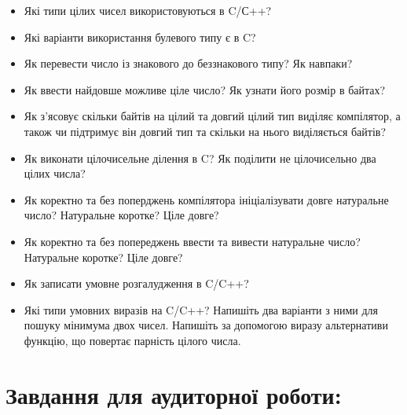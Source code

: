 \documentclass[a5paper,titlepage,openany,twoside,draft]{book_unv}%
\begin{document}
\begin{itemize}
\item Які типи цілих чисел використовуються в C/С++?
\item Які варіанти використання булевого типу є в C?
\item Як перевести число із знакового до беззнакового типу? Як навпаки?
\item Як ввести найдовше можливе ціле число? Як узнати його розмір в
байтах?
\item Як з'ясовує скільки байтів на цілий та довгий
цілий тип виділяє компілятор, а також чи підтримує він довгий тип та
скільки на нього виділяється байтів?
\item Як виконати цілочисельне ділення в C? Як поділити не цілочисельно
два цілих числа?
\item Як коректно та без поперджень компілятора ініціалізувати довге
натуральне число? Натуральне коротке? Ціле довге?
\item Як коректно та без попереджень ввести та вивести натуральне число?
Натуральне коротке? Ціле довге?
\item Як записати умовне розгалудження в C/C++?
\item Які типи умовних виразів на C/C++? Напишіть два варіанти з ними для
пошуку мінимума двох чисел. Напишіть за допомогою виразу альтернативи
функцію, що повертає парність цілого числа.
\end{itemize}

\section{Завдання для аудиторної роботи:}
\end{document}
